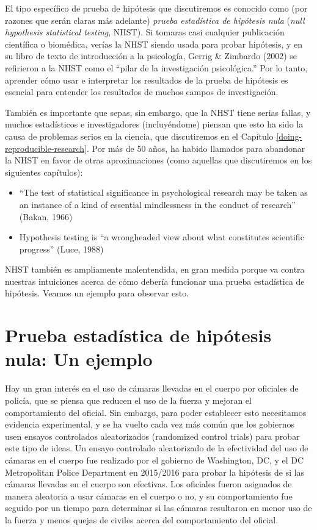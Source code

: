 \documentclass[
  12pt,
]{book}
\providecommand{\tightlist}{%
  \setlength{\itemsep}{0pt}\setlength{\parskip}{0pt}}
\theoremstyle{definition}
\theoremstyle{definition}
\theoremstyle{definition}
\theoremstyle{remark}
\begin{document}
El tipo específico de prueba de hipótesis que discutiremos es conocido como (por razones que serán claras más adelante) \emph{prueba estadística de hipótesis nula} (\emph{null hypothesis statistical testing}, NHST). Si tomaras casi cualquier publicación científica o biomédica, verías la NHST siendo usada para probar hipótesis, y en su libro de texto de introducción a la psicología, Gerrig \& Zimbardo (2002) se refirieron a la NHST como el ``pilar de la investigación psicológica.'' Por lo tanto, aprender cómo usar e interpretar los resultados de la prueba de hipótesis es esencial para entender los resultados de muchos campos de investigación.

También es importante que sepas, sin embargo, que la NHST tiene serias fallas, y muchos estadísticos e investigadores (incluyéndome) piensan que esto ha sido la causa de problemas serios en la ciencia, que discutiremos en el Capítulo \ref{doing-reproducible-research}. Por más de 50 años, ha habido llamados para abandonar la NHST en favor de otras aproximaciones (como aquellas que discutiremos en los siguientes capítulos):

\begin{itemize}
\tightlist
\item
  ``The test of statistical significance in psychological research may be taken as an instance of a kind of essential mindlessness in the conduct of research'' (Bakan, 1966)
\item
  Hypothesis testing is ``a wrongheaded view about what constitutes scientific progress'' (Luce, 1988)
\end{itemize}

NHST también es ampliamente malentendida, en gran medida porque va contra nuestras intuiciones acerca de cómo debería funcionar una prueba estadística de hipótesis. Veamos un ejemplo para observar esto.

\hypertarget{prueba-estaduxedstica-de-hipuxf3tesis-nula-un-ejemplo}{%
\section{Prueba estadística de hipótesis nula: Un ejemplo}\label{prueba-estaduxedstica-de-hipuxf3tesis-nula-un-ejemplo}}

Hay un gran interés en el uso de cámaras llevadas en el cuerpo por oficiales de policía, que se piensa que reducen el uso de la fuerza y mejoran el comportamiento del oficial. Sin embargo, para poder establecer esto necesitamos evidencia experimental, y se ha vuelto cada vez más común que los gobiernos usen ensayos controlados aleatorizados (randomized control trials) para probar este tipo de ideas. Un ensayo controlado aleatorizado de la efectividad del uso de cámaras en el cuerpo fue realizado por el gobierno de Washington, DC, y el DC Metropolitan Police Department en 2015/2016 para probar la hipótesis de si las cámaras llevadas en el cuerpo son efectivas. Los oficiales fueron asignados de manera aleatoria a usar cámaras en el cuerpo o no, y su comportamiento fue seguido por un tiempo para determinar si las cámaras resultaron en menor uso de la fuerza y menos quejas de civiles acerca del comportamiento del oficial.
\end{document}
